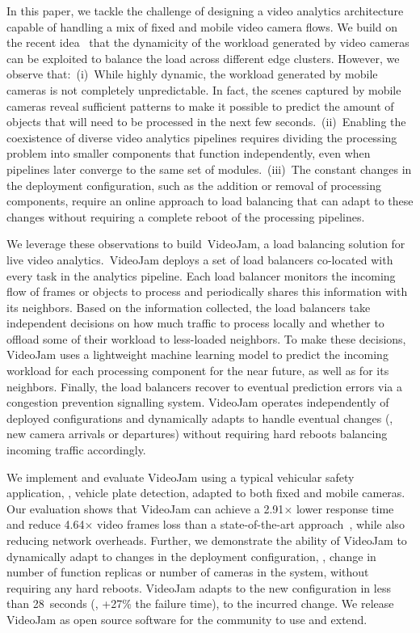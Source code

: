 In this paper, we tackle the challenge of designing a video analytics architecture capable of handling a mix of fixed and mobile video camera flows. We build on the recent idea~\cite{zeng2020distream} that the dynamicity of the workload generated by video cameras can be exploited to balance the load across different edge clusters. However, we observe that:~(i)~While highly dynamic, the workload generated by mobile cameras is not completely unpredictable. In fact, the scenes captured by mobile cameras reveal sufficient patterns to make it possible to predict the amount of objects that will need to be processed in the next few seconds.~(ii)~Enabling the coexistence of diverse video analytics pipelines requires dividing the processing problem into smaller components that function independently, even when pipelines later converge to the same set of modules.~(iii)~The constant changes in the deployment configuration, such as the addition or removal of processing components, require an online approach to load balancing that can adapt to these changes without requiring a complete reboot of the processing pipelines.

We leverage these observations to build~VideoJam, a load balancing solution for live video analytics.~VideoJam deploys a set of load balancers co-located with every task in the analytics pipeline. Each load balancer monitors the incoming flow of frames or objects to process and periodically shares this information with its neighbors. Based on the information collected, the load balancers take independent decisions on how much traffic to process locally and whether to offload some of their workload to less-loaded neighbors. To make these decisions, VideoJam uses a lightweight machine learning model to predict the incoming workload for each processing component for the near future, as well as for its neighbors. Finally, the load balancers recover to eventual prediction errors via a congestion prevention signalling system. VideoJam operates independently of deployed configurations and dynamically adapts to handle eventual changes (\eg, new camera arrivals or departures) without requiring hard reboots balancing incoming traffic accordingly.~

We implement and evaluate VideoJam using a typical vehicular safety application, \ie, vehicle plate detection, adapted to both fixed and mobile cameras. Our evaluation shows that VideoJam can achieve a 2.91$\times$ lower response time and reduce 4.64$\times$ video frames loss than a state-of-the-art approach~\cite{zeng2020distream}, while also reducing network overheads. Further, we demonstrate the ability of VideoJam to dynamically adapt to changes in the deployment configuration, \ie, change in number of function replicas or number of cameras in the system, without requiring any hard reboots. VideoJam adapts to the new configuration in less than 28~seconds (\ie, +27\% the failure time), to the incurred change. We release VideoJam as open source software for the community to use and extend.
